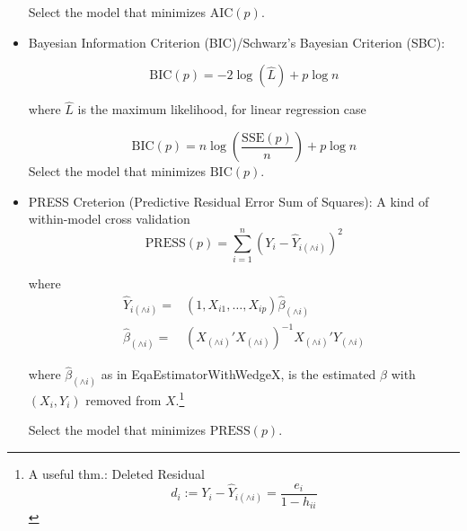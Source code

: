 \begin{itemize}[topsep=2pt,itemsep=2pt]
        Select the model that minimizes $ \mathrm{AIC}(p) $.
        \item Bayesian Information Criterion (BIC)/Schwarz's Bayesian Criterion (SBC):
        
        \begin{equation}
            \mathrm{BIC}(p)=-2\log(\hat{L})+p\log n 
        \end{equation}
        
        where $ \hat{L} $ is the maximum likelihood, for linear regression case 
        
        \begin{equation}
            \mathrm{BIC}(p)=n\log\left(\dfrac{\mathrm{SSE}(p) }{n}\right)+p\log n
        \end{equation}
        Select the model that minimizes $ \mathrm{BIC}(p) $.
        
        \item PRESS Creterion (Predictive Residual Error Sum of Squares): A kind of within-model cross validation
        \begin{equation}
            \mathrm{PRESS}(p)=\sum_{i=1}^n(Y_i-\hat{Y}_{i(\wedge i)})^2 
        \end{equation}
        
        where 
        \begin{align}
            \hat{Y}_{i(\wedge i)}=&(1,X_{i1},\ldots,X_{ip})\hat{\beta }_{(\wedge i)}\\
            \hat{\beta }_{(\wedge i)}=&(X_{(\wedge i)}'X_{(\wedge i)})^{-1}X_{(\wedge i)}'Y_{(\wedge i)}
        \end{align}
        
        where $ \hat{\beta }_{(\wedge i)} $ as in {EqaEstimatorWithWedgeX}, is the estimated $ \beta  $ with $ (X_i,Y_i) $ removed from $ X $.\footnote{A useful thm.: Deleted Residual
        \begin{equation}
            d_i:=Y_i-\hat{Y}_{i(\wedge i)}=\dfrac{e_i}{1-h_{ii}} 
        \end{equation}
        
        }
            
        Select the model that minimizes $ \mathrm{PRESS}(p) $.

        
        
        
        \end{itemize}

